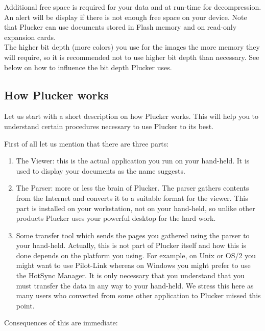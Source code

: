 Additional free space is required for your data and at run-time for
decompression. An alert will be display if there is not enough free
space on your device. Note that Plucker can use documents stored in
Flash memory and on read-only expansion cards.\\

\note{} The higher bit depth (more colors) you use for the images
the more memory they will require, so it is recommended not to use
higher bit depth than necessary. See below on how to influence the
bit depth Plucker uses.

\subsection{How Plucker works}

Let us start with a short description on how Plucker works. This will
help you to understand certain procedures necessary to use Plucker to
its best.

First of all let us mention that there are three parts:

\begin{enumerate}

  \item The Viewer: this is the actual application you run on your
  hand-held. It is used to display your documents as the name suggests.

  \item The Parser: more or less the brain of Plucker. The parser
  gathers contents from the Internet and converts it to a suitable
  format for the viewer. This part is installed on your workstation,
  not on your hand-held, so unlike other products Plucker uses your
  powerful desktop for the hard work.

  \item Some transfer tool which sends the pages you gathered using the
  parser to your hand-held. Actually, this is not part of Plucker
  itself and how this is done depends on the platform you using.
  For example, on Unix or OS/2 you might want to use Pilot-Link
  whereas on Windows you might prefer to use the HotSync Manager.
  It is only necessary that you understand that you must transfer the
  data in any way to your hand-held. We stress this here as many users
  who converted from some other application to Plucker missed this
  point.

\end{enumerate}

Consequences of this are immediate:

